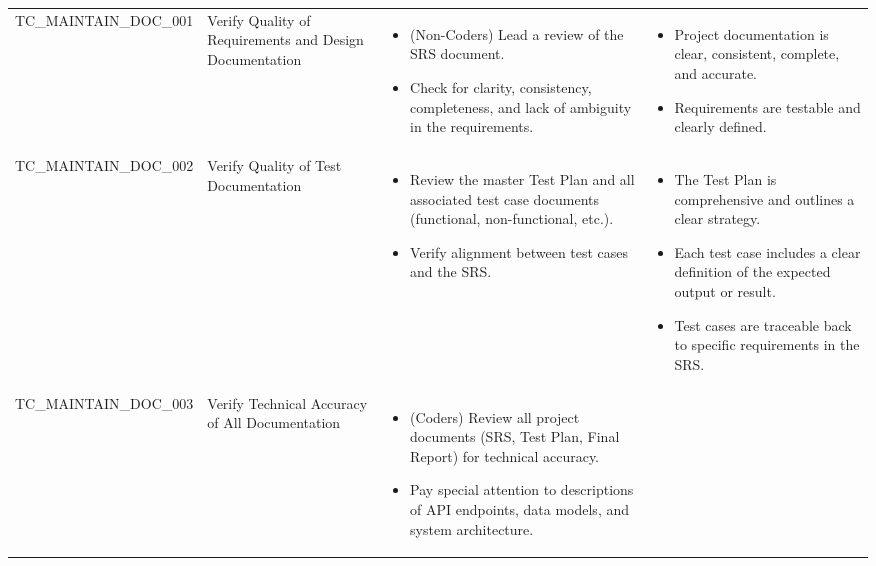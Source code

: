 \documentclass[10pt, a4paper]{report}
\begin{document}
\begin{longtable}{|>{\small\raggedright\arraybackslash}p{4cm}|>{\raggedright\arraybackslash}p{3cm}|>{\raggedright\arraybackslash}p{5cm}|>{\raggedright\arraybackslash}p{5cm}|}
\multicolumn{4}{|l|}{\textbf{Sub-Section: Documentation-Level Maintainability}} \\ \hline
TC\_MAINTAIN\_DOC\_001 & Verify Quality of Requirements and Design Documentation & 
    \begin{itemize}[noitemsep, topsep=0pt, partopsep=0pt, leftmargin=*]
        \item (Non-Coders) Lead a review of the SRS document.
        \item Check for clarity, consistency, completeness, and lack of ambiguity in the requirements.
    \end{itemize} & 
    \begin{itemize}[noitemsep, topsep=0pt, partopsep=0pt, leftmargin=*]
        \item Project documentation is clear, consistent, complete, and accurate.
        \item Requirements are testable and clearly defined.
    \end{itemize} \\ \hline
TC\_MAINTAIN\_DOC\_002 & Verify Quality of Test Documentation & 
    \begin{itemize}[noitemsep, topsep=0pt, partopsep=0pt, leftmargin=*]
        \item Review the master Test Plan and all associated test case documents (functional, non-functional, etc.).
        \item Verify alignment between test cases and the SRS.
    \end{itemize} & 
    \begin{itemize}[noitemsep, topsep=0pt, partopsep=0pt, leftmargin=*]
        \item The Test Plan is comprehensive and outlines a clear strategy.
        \item Each test case includes a clear definition of the expected output or result.
        \item Test cases are traceable back to specific requirements in the SRS.
    \end{itemize} \\ \hline
TC\_MAINTAIN\_DOC\_003 & Verify Technical Accuracy of All Documentation & 
    \begin{itemize}[noitemsep, topsep=0pt, partopsep=0pt, leftmargin=*]
        \item (Coders) Review all project documents (SRS, Test Plan, Final Report) for technical accuracy.
        \item Pay special attention to descriptions of API endpoints, data models, and system architecture.

\end{itemize}
\end{longtable}
\end{document}
